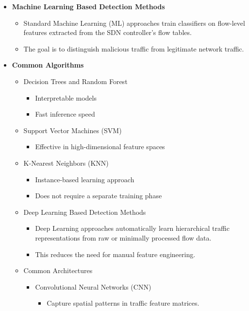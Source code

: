 \documentclass[12pt,a4paper]{article}
\begin{document}
\begin{itemize}
  \item \textbf{Machine Learning Based Detection Methods}
  \begin{itemize}
    \item Standard Machine Learning (ML) approaches train classifiers on
    flow-level features extracted from the SDN controller's flow tables.
    \item The goal is to distinguish malicious traffic from legitimate network
    traffic.
  \end{itemize}
  \item \textbf{Common Algorithms}
  \begin{itemize}
    \item Decision Trees and Random Forest
    \begin{itemize}
      \item Interpretable models
      \item Fast inference speed
    \end{itemize}
    \item Support Vector Machines (SVM)
    \begin{itemize}
      \item Effective in high-dimensional feature spaces
    \end{itemize}
    \item K-Nearest Neighbors (KNN)
    \begin{itemize}
      \item Instance-based learning approach
      \item Does not require a separate training phase
    \end{itemize}
    \item Deep Learning Based Detection Methods
    \begin{itemize}
      \item Deep Learning approaches automatically learn hierarchical traffic
      representations from raw or minimally processed flow data.
      \item This reduces the need for manual feature engineering.
    \end{itemize}
    \item Common Architectures
    \begin{itemize}
      \item Convolutional Neural Networks (CNN)
      \begin{itemize}
        \item Capture spatial patterns in traffic feature matrices.

\end{itemize}
\end{itemize}
\end{itemize}
\end{itemize}
\end{document}
